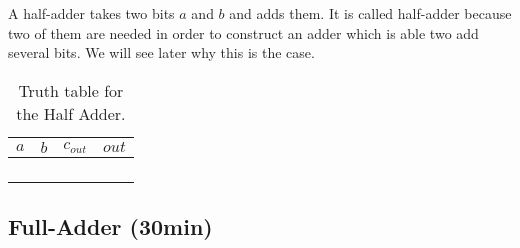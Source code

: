 A half-adder takes two bits $a$ and $b$ and adds them. It is called half-adder because two of them are needed in order to construct an adder which is able two add several bits. We will see later why this is the case.
\begin{table}[H]
	\centering
	\begin{tabular}{|c|c||c|c|}
		\hline
		$a$ & $b$ & $c_{out}$ & $out$ \\ \hline
		&     &           &       \\ \hline
		&     &           &       \\ \hline
		&     &           &       \\ \hline
		&     &           &       \\ \hline
	\end{tabular}
	\caption{Truth table for the Half Adder.}
	\label{tab:half-adder-truth-table}
\end{table}

\subsection{Full-Adder (30min)}

\newpage